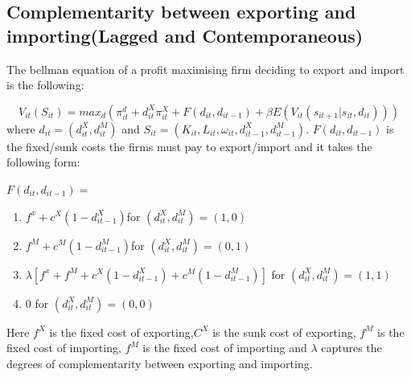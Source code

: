 \documentclass[11pt]{article}
\begin{document}
% 
% 

\subsection{Complementarity between exporting and importing(Lagged and
Contemporaneous)}

The bellman equation of a profit maximising firm deciding to export
and import is the following:  

\begin{equation}
V_{it}(S_{it}) = max_d(\pi_{it}^{d} +d_{it}^{X}\pi_{it}^{X} +
F(d_{it}, d_{it-1}) + \beta E(V_{it}(s_{it+1}|s_{it}, d_{it})))
\end{equation}
where $d_{it}= (d_{it}^X, d_{it}^M)$ and $S_{it}= (K_{it}, L_{it},
\omega_{it}, d_{it-1}^X, d_{it-1}^M)$.  $F(d_{it}, d_{it-1})$ is the
fixed/sunk costs the firms must pay to export/import and it takes the
following form:

$F(d_{it}, d_{it-1})= $
\begin{enumerate}
\item   $f^{x} + c^{X}(1 - d_{it-1}^X)$\hfill  for $ (d_{it}^X, d_{it}^M) =
  (1,0) $
\item   $f^{M} + c^{M}(1 - d_{it-1}^M)$\hfill  for $ (d_{it}^X, d_{it}^M) =
  (0,1) $
\item   $\lambda[f^{x} + f^{M} + c^{X}(1 - d_{it-1}^X) + c^{M}(1 -
  d_{it-1}^M)]$  \hfill for $ (d_{it}^X, d_{it}^M) =
  (1,1) $
\item   0  \hfill for $ (d_{it}^X, d_{it}^M) =
  (0,0) $
\end{enumerate}
Here $f^{X}$ is the fixed cost of exporting,$C^{X}$ is the sunk cost
of exporting, $f^{M}$ is the fixed cost of importing, $f^{M}$ is the
fixed cost of importing and $\lambda$ captures the degrees of
complementarity between exporting and importing. 
\end{document}
